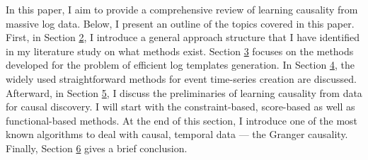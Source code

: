 In this paper, I aim to provide a comprehensive review of learning causality from massive log data. Below, I present an outline of the topics covered in this paper. First, in Section \hyperref[sec:2]{2}, I introduce a general approach structure that I have identified in my literature study on what methods exist. Section \hyperref[sec:3]{3} focuses on the methods developed for the problem of efficient log templates generation. In Section \hyperref[sec:4]{4}, the widely used straightforward methods for event time-series creation are discussed. Afterward, in Section \hyperref[sec:5]{5}, I discuss the preliminaries of learning causality from data for causal discovery. I will start with the constraint-based, score-based as well as functional-based methods. At the end of this section, I introduce one of the most known algorithms to deal with causal, temporal data — the Granger causality. Finally, Section \hyperref[sec:6]{6} gives a brief conclusion.


